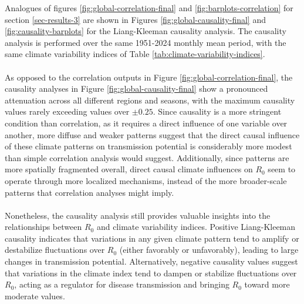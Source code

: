 \documentclass[10pt,twocolumn]{wlscirep}
\begin{document}
Analogues of figures \ref{fig:global-correlation-final} and \ref{fig:barplots-correlation} for section \ref{sec-results-3} are shown in Figures \ref{fig:global-causality-final} and \ref{fig:causality-barplots} for the Liang-Kleeman causality analysis. The causality analysis is performed over the same 1951-2024 monthly mean period, with the same climate variability indices of Table \ref{tab:climate-variability-indices}.
\\
\\
As opposed to the correlation outputs in Figure \ref{fig:global-correlation-final}, the causality analyses in Figure \ref{fig:global-causality-final} show a pronounced attenuation across all different regions and seasons, with the maximum causality values rarely exceeding values over $\pm0.25$. Since causality is a more stringent condition than correlation, as it requires a direct influence of one variable over another, more diffuse and weaker patterns suggest that the direct causal influence of these climate patterns on transmission potential is considerably more modest than simple correlation analysis would suggest. Additionally, since patterns are more spatially fragmented overall, direct causal climate influences on $R_0$ seem to operate through more localized mechanisms, instead of the more broader-scale patterns that correlation analyses might imply.
\\
\\
Nonetheless, the causality analysis still provides valuable insights into the relationships between $R_0$ and climate variability indices. Positive Liang-Kleeman causality indicates that variations in any given climate pattern tend to amplify or destabilize fluctuations over $R_0$ (either favorably or unfavorably), leading to large changes in transmission potential. Alternatively, negative causality values suggest that variations in the climate index tend to dampen or stabilize fluctuations over $R_0$, acting as a regulator for disease transmission and bringing $R_0$ toward more moderate values.
\\
\\
\end{document}
